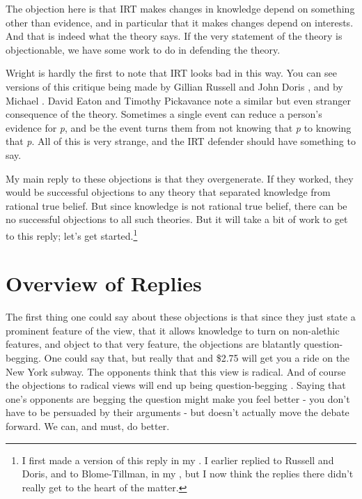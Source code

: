\documentclass[
  11pt,
]{book}
\begin{document}
The objection here is that IRT makes changes in knowledge depend on something other than evidence, and in particular that it makes changes depend on interests. And that is indeed what the theory says. If the very statement of the theory is objectionable, we have some work to do in defending the theory.

Wright is hardly the first to note that IRT looks bad in this way. You can see versions of this critique being made by Gillian Russell and John Doris \citeyearpar{RussellDoris2008}, and by Michael \citet{BlomeTillmann2009}. David Eaton and Timothy Pickavance \citeyearpar{EatonPickavance2015} note a similar but even stranger consequence of the theory. Sometimes a single event can reduce a person's evidence for \emph{p}, and be the event turns them from not knowing that \emph{p} to knowing that \emph{p}. All of this is very strange, and the IRT defender should have something to say.

My main reply to these objections is that they overgenerate. If they worked, they would be successful objections to any theory that separated knowledge from rational true belief. But since knowledge is not rational true belief, there can be no successful objections to all such theories. But it will take a bit of work to get to this reply; let's get started.\footnote{I first made a version of this reply in my \citeyearpar{Weatherson2016-WEARTE}. I earlier replied to Russell and Doris, and to Blome-Tillman, in my \citeyearpar{Weatherson2011-WEADIR}, but I now think the replies there didn't really get to the heart of the matter.}

\hypertarget{overview}{%
\section{Overview of Replies}\label{overview}}

The first thing one could say about these objections is that since they just state a prominent feature of the view, that it allows knowledge to turn on non-alethic features, and object to that very feature, the objections are blatantly question-begging. One could say that, but really that and \$2.75 will get you a ride on the New York subway. The opponents think that this view is radical. And of course the objections to radical views will end up being question-begging \citep{Lewis1982c}. Saying that one's opponents are begging the question might make you feel better - you don't have to be persuaded by their arguments - but doesn't actually move the debate forward. We can, and must, do better.
\end{document}
